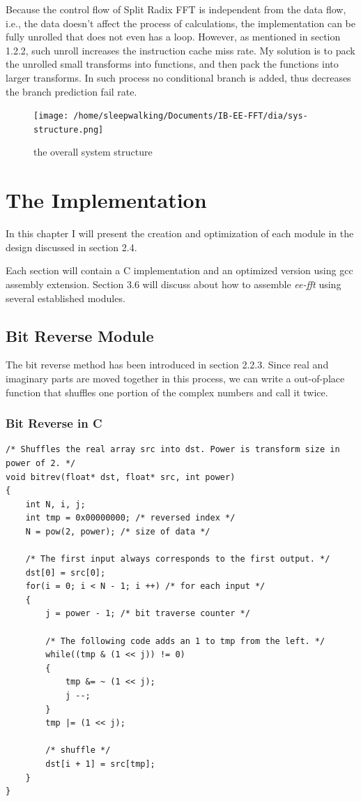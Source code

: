 \documentclass[a4paper]{report}
\begin{document}
	Because the control flow of Split Radix FFT is independent from the data flow, i.e., the data doesn't affect the process of calculations, the implementation can be fully unrolled that does not even has a loop. However, as mentioned in section 1.2.2, such unroll increases the instruction cache miss rate. My solution is to pack the unrolled small transforms into functions, and then pack the functions into larger transforms. In such process no conditional branch is added, thus decreases the branch prediction fail rate.

\begin{figure}[htp]
\centering
\texttt{[image: /home/sleepwalking/Documents/IB-EE-FFT/dia/sys-structure.png]}
\caption{the overall system structure}
\label{}
\end{figure}
\chapter{The Implementation} \indent

	In this chapter I will present the creation and optimization of each module in the design discussed in section 2.4.
	
	Each section will contain a C implementation and an optimized version using gcc assembly extension. Section 3.6 will discuss about how to assemble \textit{ee-fft} using several established modules.

\section{Bit Reverse Module} \indent

	The bit reverse method has been introduced in section 2.2.3. Since real and imaginary parts are moved together in this process, we can write a out-of-place function that shuffles one portion of the complex numbers and call it twice.
	
\subsection{Bit Reverse in C} \indent

        \lstset{language = c, tabsize = 4}
        \begin{lstlisting}
/* Shuffles the real array src into dst. Power is transform size in power of 2. */
void bitrev(float* dst, float* src, int power)
{
    int N, i, j;
    int tmp = 0x00000000; /* reversed index */
    N = pow(2, power); /* size of data */
    
    /* The first input always corresponds to the first output. */
    dst[0] = src[0];
    for(i = 0; i < N - 1; i ++) /* for each input */
    {
        j = power - 1; /* bit traverse counter */
        
        /* The following code adds an 1 to tmp from the left. */
        while((tmp & (1 << j)) != 0)
        {
            tmp &= ~ (1 << j);
            j --;
        }
        tmp |= (1 << j);
        
        /* shuffle */
        dst[i + 1] = src[tmp];
    }
}
        \end{lstlisting}
\end{document}
